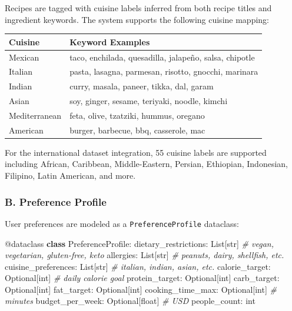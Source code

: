 \documentclass[
  10pt,
]{article}
\newenvironment{Shaded}{}{}
\newcommand{\AttributeTok}[1]{\textcolor[rgb]{0.49,0.56,0.16}{#1}}
\newcommand{\BuiltInTok}[1]{\textcolor[rgb]{0.00,0.50,0.00}{#1}}
\newcommand{\CommentTok}[1]{\textcolor[rgb]{0.38,0.63,0.69}{\textit{#1}}}
\newcommand{\KeywordTok}[1]{\textcolor[rgb]{0.00,0.44,0.13}{\textbf{#1}}}
\newcommand{\NormalTok}[1]{#1}
\begin{document}
Recipes are tagged with cuisine labels inferred from both recipe titles
and ingredient keywords. The system supports the following cuisine
mapping:

\begin{longtable}[]{@{}ll@{}}
\toprule\noalign{}
Cuisine & Keyword Examples \\
\midrule\noalign{}
\endhead
\bottomrule\noalign{}
\endlastfoot
Mexican & taco, enchilada, quesadilla, jalapeño, salsa, chipotle \\
Italian & pasta, lasagna, parmesan, risotto, gnocchi, marinara \\
Indian & curry, masala, paneer, tikka, dal, garam \\
Asian & soy, ginger, sesame, teriyaki, noodle, kimchi \\
Mediterranean & feta, olive, tzatziki, hummus, oregano \\
American & burger, barbecue, bbq, casserole, mac \\
\end{longtable}

For the international dataset integration, 55 cuisine labels are
supported including African, Caribbean, Middle-Eastern, Persian,
Ethiopian, Indonesian, Filipino, Latin American, and more.

\subsubsection{B. Preference Profile}\label{b.-preference-profile}

User preferences are modeled as a \texttt{PreferenceProfile} dataclass:

\begin{Shaded}
\begin{Highlighting}[]
\AttributeTok{@dataclass}
\KeywordTok{class}\NormalTok{ PreferenceProfile:}
\NormalTok{    dietary\_restrictions: List[}\BuiltInTok{str}\NormalTok{]   }\CommentTok{\# vegan, vegetarian, gluten{-}free, keto}
\NormalTok{    allergies: List[}\BuiltInTok{str}\NormalTok{]              }\CommentTok{\# peanuts, dairy, shellfish, etc.}
\NormalTok{    cuisine\_preferences: List[}\BuiltInTok{str}\NormalTok{]    }\CommentTok{\# italian, indian, asian, etc.}
\NormalTok{    calorie\_target: Optional[}\BuiltInTok{int}\NormalTok{]     }\CommentTok{\# daily calorie goal}
\NormalTok{    protein\_target: Optional[}\BuiltInTok{int}\NormalTok{]}
\NormalTok{    carb\_target: Optional[}\BuiltInTok{int}\NormalTok{]}
\NormalTok{    fat\_target: Optional[}\BuiltInTok{int}\NormalTok{]}
\NormalTok{    cooking\_time\_max: Optional[}\BuiltInTok{int}\NormalTok{]   }\CommentTok{\# minutes}
\NormalTok{    budget\_per\_week: Optional[}\BuiltInTok{float}\NormalTok{]  }\CommentTok{\# USD}
\NormalTok{    people\_count: }\BuiltInTok{int}
\end{Highlighting}
\end{Shaded}
\end{document}
